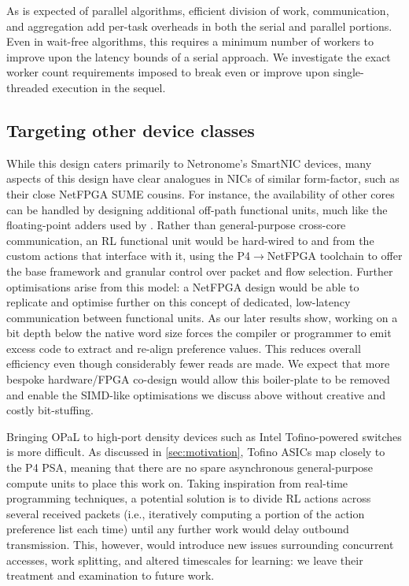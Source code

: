 \documentclass[sigconf,natbib=false]{acmart}
\newcommand{\approachshort}{OPaL}
\begin{document}
As is expected of parallel algorithms, efficient division of work, communication, and aggregation add per-task overheads in both the serial and parallel portions.
Even in wait-free algorithms, this requires a minimum number of workers to improve upon the latency bounds of a serial approach.
We investigate the exact worker count requirements imposed to break even or improve upon single-threaded execution in the sequel.

\subsection{Targeting other device classes}
While this design caters primarily to Netronome's SmartNIC devices, many aspects of this design have clear analogues in NICs of similar form-factor, such as their close NetFPGA SUME cousins.
For instance, the availability of other cores can be handled by designing additional off-path functional units, much like the floating-point adders used by \textcite{DBLP:conf/isca/LiLYCSH19}.
Rather than general-purpose cross-core communication, an RL functional unit would be hard-wired to and from the custom actions that interface with it, using the P4$\rightarrow$NetFPGA toolchain to offer the base framework and granular control over packet and flow selection.
Further optimisations arise from this model: a NetFPGA design would be able to replicate and optimise further on this concept of dedicated, low-latency communication between functional units.
As our later results show, working on a bit depth below the native word size forces the compiler or programmer to emit excess code to extract and re-align preference values.
This reduces overall efficiency even though considerably fewer reads are made.
We expect that more bespoke hardware/FPGA co-design would allow this boiler-plate to be removed and enable the SIMD-like optimisations we discuss above without creative and costly bit-stuffing.

Bringing \approachshort{} to high-port density devices such as Intel Tofino-powered switches is more difficult.
As discussed in \cref{sec:motivation}, Tofino ASICs map closely to the P4 PSA, meaning that there are no spare asynchronous general-purpose compute units to place this work on.
Taking inspiration from real-time programming techniques, a potential solution is to divide RL actions across several received packets (i.e., iteratively computing a portion of the action preference list each time) until any further work would delay outbound transmission.
This, however, would introduce new issues surrounding concurrent accesses, work splitting, and altered timescales for learning: we leave their treatment and examination to future work.
\end{document}
